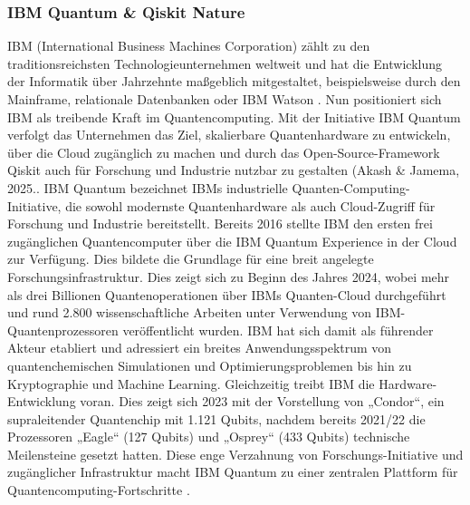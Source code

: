 \subsubsection*{IBM Quantum & Qiskit Nature} 
IBM (International Business Machines Corporation) zählt zu den traditionsreichsten Technologieunternehmen weltweit und hat die Entwicklung der Informatik über Jahrzehnte maßgeblich mitgestaltet, beispielsweise durch den Mainframe, relationale Datenbanken oder IBM Watson \cite{aruteQuantumSupremacyUsing2019a}. Nun positioniert sich IBM als treibende Kraft im Quantencomputing. Mit der Initiative IBM Quantum verfolgt das Unternehmen das Ziel, skalierbare Quantenhardware zu entwickeln, über die Cloud zugänglich zu machen und durch das Open-Source-Framework Qiskit auch für Forschung und Industrie nutzbar zu gestalten \cite{} (Akash & Jamema, 2025.\cite{miceliQuantumComputationVisualization2018}. 
IBM Quantum bezeichnet IBMs industrielle Quanten-Computing-Initiative, die sowohl modernste Quantenhardware als auch Cloud-Zugriff für Forschung und Industrie bereitstellt. Bereits 2016 stellte IBM den ersten frei zugänglichen Quantencomputer über die IBM Quantum Experience in der Cloud zur Verfügung. Dies bildete die Grundlage für eine breit angelegte Forschungsinfrastruktur. Dies zeigt sich zu Beginn des Jahres 2024, wobei mehr als drei Billionen Quantenoperationen über IBMs Quanten-Cloud durchgeführt und rund 2.800 wissenschaftliche Arbeiten unter Verwendung von IBM-Quantenprozessoren veröffentlicht wurden. IBM hat sich damit als führender Akteur etabliert und adressiert ein breites Anwendungsspektrum von quantenchemischen Simulationen und Optimierungsproblemen bis hin zu Kryptographie und Machine Learning. Gleichzeitig treibt IBM die Hardware-Entwicklung voran. Dies zeigt sich 2023 mit der Vorstellung von „Condor“, ein supraleitender Quantenchip mit 1.121 Qubits, nachdem bereits 2021/22 die Prozessoren „Eagle“ (127 Qubits) und „Osprey“ (433 Qubits) technische Meilensteine gesetzt hatten. Diese enge Verzahnung von Forschungs-Initiative und zugänglicher Infrastruktur macht IBM Quantum zu einer zentralen Plattform für Quantencomputing-Fortschritte \citealp[2]{abughanemIBMQuantumComputers2025}.
